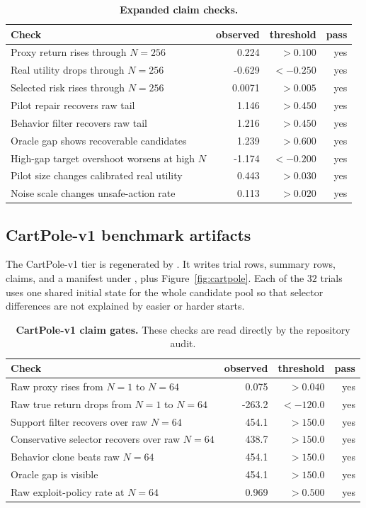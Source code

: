 \begin{table}[t]
\centering
\small
\caption{\textbf{Expanded claim checks.}}
\label{tab:claims}
\begin{tabularx}{\linewidth}{Xrrr}
\toprule
Check & observed & threshold & pass \\
\midrule
Proxy return rises through $N=256$ & 0.224 & $>0.100$ & yes \\
Real utility drops through $N=256$ & -0.629 & $<-0.250$ & yes \\
Selected risk rises through $N=256$ & 0.0071 & $>0.005$ & yes \\
Pilot repair recovers raw tail & 1.146 & $>0.450$ & yes \\
Behavior filter recovers raw tail & 1.216 & $>0.450$ & yes \\
Oracle gap shows recoverable candidates & 1.239 & $>0.600$ & yes \\
High-gap target overshoot worsens at high $N$ & -1.174 & $<-0.200$ & yes \\
Pilot size changes calibrated real utility & 0.443 & $>0.030$ & yes \\
Noise scale changes unsafe-action rate & 0.113 & $>0.020$ & yes \\
\bottomrule
\end{tabularx}
\end{table}

\subsection{CartPole-v1 benchmark artifacts}

The CartPole-v1 tier is regenerated by . It writes trial rows, summary rows, claims, and a manifest under , plus Figure~\ref{fig:cartpole}. Each of the $32$ trials uses one shared initial state for the whole candidate pool so that selector differences are not explained by easier or harder starts.

\begin{table}[t]
\centering
\small
\caption{\textbf{CartPole-v1 claim gates.} These checks are read directly by the repository audit.}
\label{tab:cartpole-claims}
\begin{tabularx}{\linewidth}{Xrrr}
\toprule
Check & observed & threshold & pass \\
\midrule
Raw proxy rises from $N=1$ to $N=64$ & 0.075 & $>0.040$ & yes \\
Raw true return drops from $N=1$ to $N=64$ & -263.2 & $<-120.0$ & yes \\
Support filter recovers over raw $N=64$ & 454.1 & $>150.0$ & yes \\
Conservative selector recovers over raw $N=64$ & 438.7 & $>150.0$ & yes \\
Behavior clone beats raw $N=64$ & 454.1 & $>150.0$ & yes \\
Oracle gap is visible & 454.1 & $>150.0$ & yes \\
Raw exploit-policy rate at $N=64$ & 0.969 & $>0.500$ & yes \\
\bottomrule
\end{tabularx}
\end{table}


